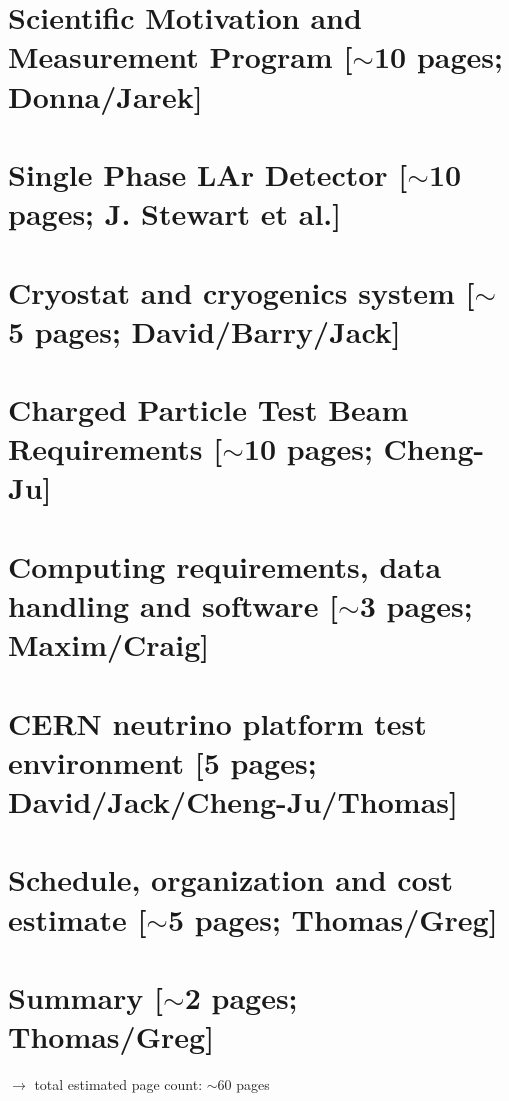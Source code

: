 \documentclass[12pt]{article}
\begin{document}
\section{Scientific Motivation and Measurement Program [$\sim$10 pages; {\color{red} Donna/Jarek}]}
	
	

\section{Single Phase LAr Detector [$\sim$10 pages; {\color{red} J. Stewart et al.}]}
\rm

	


\section{Cryostat and cryogenics system [$\sim$5 pages; {\color{red} David/Barry/Jack}]}
	

\newpage
\section{Charged Particle Test Beam Requirements [$\sim$10 pages; {\color{red} Cheng-Ju}]}
	


\section{Computing requirements, data handling and software  [$\sim$3 pages; {\color{red} Maxim/Craig}]}
	

\section{CERN neutrino platform test environment [5 pages; {\color{red} David/Jack/Cheng-Ju/Thomas}]}
	
	
	
\section{Schedule, organization and cost estimate [$\sim$5 pages; {\color{red} Thomas/Greg}]}
	

\section{Summary [$\sim$2 pages; {\color{red} Thomas/Greg}]}
	




{\color{red}
$\rightarrow$ total estimated page count: $\sim$60 pages}
\end{document}
